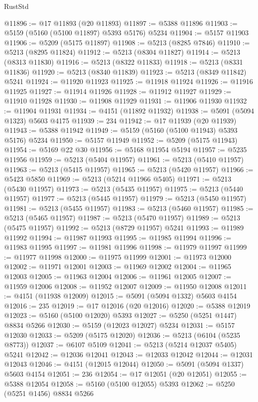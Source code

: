 \begin{lexlean}{RustStd}
\begin{coremodule}
@11896 := @17 @11893 (@20 @11893)
@11897 := @5388 @11896
@11903 := @5159 (@5160 (@5100 @11897) @5393 @5176) @5234
@11904 := @5157 @11903
@11906 := @5209 (@5175 @11897)
@11908 := @5213 (@8285 @7846)
@11910 := @5213 (@8295 @11824)
@11912 := @5213 (@8304 @11827)
@11914 := @5213 (@8313 @11830)
@11916 := @5213 (@8322 @11833)
@11918 := @5213 (@8331 @11836)
@11920 := @5213 (@8340 @11839)
@11923 := @5213 (@8349 @11842) @5241
@11924 := @11920 @11923
@11925 := @11918 @11924
@11926 := @11916 @11925
@11927 := @11914 @11926
@11928 := @11912 @11927
@11929 := @11910 @11928
@11930 := @11908 @11929
@11931 := @11906 @11930
@11932 := @11904 @11931
@11934 := @4151 (@11892 @11932)
@11938 := @5091 (@5094 @1323) @5603 @4175
@11939 := 234
@11942 := @17 @11939 (@20 @11939)
@11943 := @5388 @11942
@11949 := @5159 (@5160 (@5100 @11943) @5393 @5176) @5234
@11950 := @5157 @11949
@11952 := @5209 (@5175 @11943)
@11954 := @5169 @22 @30
@11956 := @5168 @11954 @5194
@11957 := @5235 @11956
@11959 := @5213 (@5404 @11957)
@11961 := @5213 (@5410 @11957)
@11963 := @5213 (@5415 @11957)
@11965 := @5213 (@5420 @11957)
@11966 := @5423 @5850
@11969 := @5213 (@5214 @11966 @5405)
@11971 := @5213 (@5430 @11957)
@11973 := @5213 (@5435 @11957)
@11975 := @5213 (@5440 @11957)
@11977 := @5213 (@5445 @11957)
@11979 := @5213 (@5450 @11957)
@11981 := @5213 (@5455 @11957)
@11983 := @5213 (@5460 @11957)
@11985 := @5213 (@5465 @11957)
@11987 := @5213 (@5470 @11957)
@11989 := @5213 (@5475 @11957)
@11992 := @5213 (@8729 @11957) @5241
@11993 := @11989 @11992
@11994 := @11987 @11993
@11995 := @11985 @11994
@11996 := @11983 @11995
@11997 := @11981 @11996
@11998 := @11979 @11997
@11999 := @11977 @11998
@12000 := @11975 @11999
@12001 := @11973 @12000
@12002 := @11971 @12001
@12003 := @11969 @12002
@12004 := @11965 @12003
@12005 := @11963 @12004
@12006 := @11961 @12005
@12007 := @11959 @12006
@12008 := @11952 @12007
@12009 := @11950 @12008
@12011 := @4151 (@11938 @12009)
@12015 := @5091 (@5094 @1332) @5603 @4154
@12016 := 235
@12019 := @17 @12016 (@20 @12016)
@12020 := @5388 @12019
@12023 := @5160 (@5100 @12020) @5393
@12027 := @5250 (@5251 @1447) @8834 @5266
@12030 := @5159 (@12023 @12027) @5234
@12031 := @5157 @12030
@12033 := @5209 (@5175 @12020)
@12036 := @5213 (@6104 (@5235 @8773))
@12037 := @6107 @5109
@12041 := @5213 (@5214 @12037 @5405) @5241
@12042 := @12036 @12041
@12043 := @12033 @12042
@12044 := @12031 @12043
@12046 := @4151 (@12015 @12044)
@12050 := @5091 (@5094 @1337) @5603 @4154
@12051 := 236
@12054 := @17 @12051 (@20 @12051)
@12055 := @5388 @12054
@12058 := @5160 (@5100 @12055) @5393
@12062 := @5250 (@5251 @1456) @8834 @5266

\end{coremodule}
\end{lexlean}
